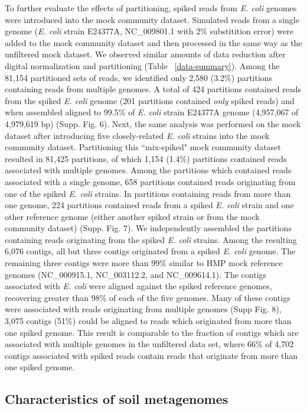 \documentclass[11pt]{article} %
\begin{document}
To further evaluate the effects of partitioning, spiked reads from
\emph{E. coli} genomes were introduced into the mock community
dataset. Simulated reads from a single genome (\emph{E. coli} strain
E24377A, NC\_009801.1 with 2\% substitition error) were added to the
mock community dataset and then processed in the same way as the
unfiltered mock dataset.  We observed similar amounts of data
reduction after digital normalization and partitioning (Table
~\ref{data-summary}).  Among the 81,154 partitioned sets of reads, we
identified only 2,580 (3.2\%) partitions containing reads from
multiple genomes.  A total of 424 partitions contained reads from the
spiked \emph{E. coli} genome (201 partitions contained \emph{only}
spiked reads) and when assembled aligned to 99.5\% of \emph{E. coli}
strain E24377A genome (4,957,067 of 4,979,619 bp) (Supp. Fig. 6).
Next, the same analysis was performed on the mock dataset after
introducing five closely-related \emph{E. coli} strains into the mock
community dataset.  Partitioning this ``mix-spiked" mock community
dataset resulted in 81,425 partitions, of which 1,154 (1.4\%)
partitions contained reads associated with multiple genomes.  Among
the partitions which contained reads associated with a single genome,
658 partitions contained reads originating from one of the spiked
\emph{E. coli} strains.  In partitions containing reads from more than
one genome, 224 partitions contained reads from a spiked
\emph{E. coli} strain and one other reference genome (either another
spiked strain or from the mock community dataset) (Supp. Fig. 7).  We
independently assembled the partitions containing reads originating
from the spiked \emph{E. coli} strains.  Among the resulting 6,076
contigs, all but three contigs originated from a spiked \emph{E. coli}
genome.  The remaining three contigs were more than 99\% similar to
HMP mock reference genomes (NC\_000915.1, NC\_003112.2, and
NC\_009614.1).  The contigs associated with \emph{E. coli} were
aligned against the spiked reference genomes, recovering greater than
98\% of each of the five genomes.  Many of these contigs were
associated with reads originating from multiple genomes (Supp Fig. 8),
3,075 contigs (51\%) could be aligned to reads which originated from
more than one spiked genome.  This result is comparable to the
fraction of contigs which are associated with multiple genomes in the
unfiltered data set, where 66\% of 4,702 contigs associated with
spiked reads contain reads that originate from more than one spiked
genome.

\subsection{Characteristics of soil metagenomes}
\end{document}

